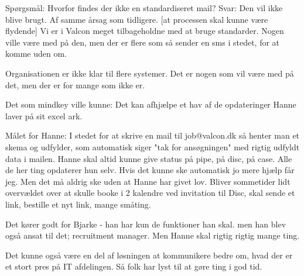 Spørgsmål:
Hvorfor findes der ikke en standardiseret mail?
Svar:
Den vil ikke blive brugt. Af samme årsag som tidligere.  [at processen skal kunne være flydende]
Vi er i Valcon meget tilbageholdne med at bruge standarder.
Nogen ville være med på den, men der er flere som så sender en sms i stedet, for at komme uden om. 

Organisationen er ikke klar til flere systemer. Det er nogen som vil være med på det, men der er for mange som ikke er.


Det som mindkey ville kunne:
Det kan afhjælpe et hav af de opdateringer Hanne laver på sit excel ark. 


Målet for Hanne:
I stedet for at skrive en mail til job@valcon.dk så henter man et skema og udfylder, som automatisk siger "tak for ansøgningen" med rigtig udfyldt data i mailen.
Hanne skal altid kunne give status på pipe, på disc, på case. Alle de her ting opdaterer hun selv. Hvis det kunne ske automatisk jo mere hjælp får jeg.
Men det må aldrig ske uden at Hanne har givet lov.
Bliver sommetider lidt overvældet over at skulle booke i 2 kalendre ved invitation til Disc, skal sende et link, bestille et nyt link, mange småting. 

Det kører godt for Bjarke - han har kun de funktioner han skal. men han blev også ansat til det; recruitment manager. Men Hanne skal rigtig rigtig mange ting.


Det kunne også være en del af løsningen at kommunikere bedre om, hvad der er et stort pres på IT afdelingen. Så folk har lyst til at gøre ting i god tid.

